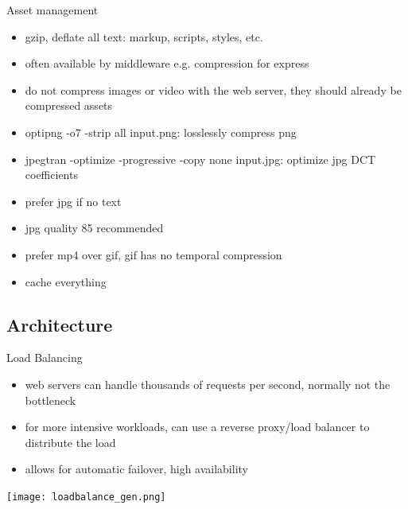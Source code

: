 \documentclass{beamer}
\begin{document}
\begin{frame}{Asset management}
  \begin{itemize}
    \item gzip, deflate all text: markup, scripts, styles, etc.
    \item often available by middleware e.g. compression for express
    \item do not compress images or video with the web server, they should
      already be compressed assets
    \item optipng -o7 -strip all input.png: losslessly compress png
    \item jpegtran -optimize -progressive -copy none input.jpg: optimize jpg
      DCT coefficients
    \item prefer jpg if no text
    \item jpg quality 85 recommended
    \item prefer mp4 over gif, gif has no temporal compression
    \item cache everything
  \end{itemize}
\end{frame}

\subsection{Architecture}

\begin{frame}{Load Balancing}
  \begin{itemize}
    \item web servers can handle thousands of requests per second, normally not
      the bottleneck
    \item for more intensive workloads, can use a reverse proxy/load balancer to
      distribute the load
    \item allows for automatic failover, high availability
  \end{itemize}
  \texttt{[image: loadbalance\_gen.png]}
\end{frame}
\end{document}

